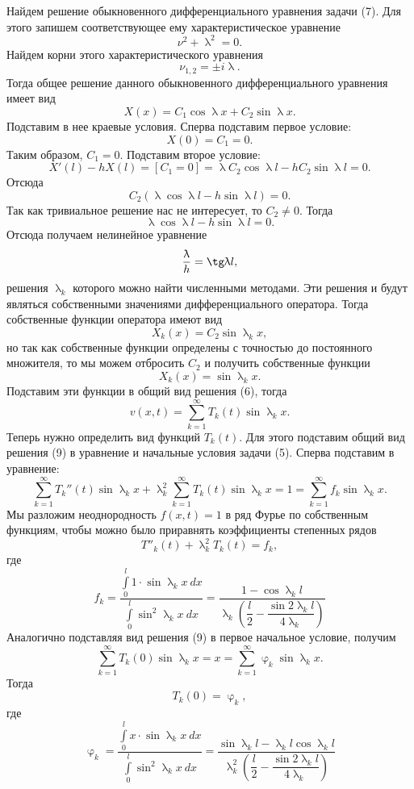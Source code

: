 \documentclass[a4paper, 12pt]{report}
\numberwithin{equation}{section}
\renewcommand{\varphi}{\upvarphi}
\renewcommand{\lambda}{\uplambda}
\newcommand{\intl}{\int\limits_{0}^l}
\newcommand{\sumk}{\sum\limits_{k=1}^\infty}
\begin{document}
	Найдем решение обыкновенного дифференциального уравнения задачи (7). Для этого запишем соответствующее ему характеристическое уравнение
	$$\nu^2 + \lambda ^2 = 0.$$
	Найдем корни этого характеристического уравнения
	$$\nu_{1,2} = \pm i \lambda.$$ Тогда общее решение данного обыкновенного дифференциального уравнения имеет вид
	$$X(x) = C_1\cos \lambda x + C_2 \sin \lambda x.$$
	Подставим в нее краевые условия. Сперва подставим первое условие:
	$$X(0) = C_1 = 0.$$
	Таким образом, $C_1 = 0$. Подставим второе условие:
	$$X'(l) - hX(l) = [C_1 = 0] = \lambda C_2 \cos \lambda l - h C_2\sin \lambda l = 0.$$
	Отсюда
	$$C_2 ( \lambda \cos \lambda l  - h \sin \lambda l) = 0.$$
	Так как тривиальное решение нас не интересует, то $C_2 \ne 0$. Тогда
	$$\lambda \cos \lambda l  - h \sin \lambda l = 0.$$
	Отсюда получаем нелинейное уравнение
	\begin{equation}
		\dfrac{\lambda}{h} = \tg \lambda l,
	\end{equation}
	решения $\lambda_k$ которого можно найти численными методами. Эти решения и будут являться собственными значениями дифференциального оператора. Тогда собственные функции оператора имеют вид
	$$X_k(x) = C_2\sin \lambda_k x,$$
	но так как собственные функции определены с точностью до постоянного множителя, то мы можем отбросить $C_2$ и получить собственные функции
	$$X_k(x) = \sin \lambda_k x.$$
	Подставим эти функции в общий вид решения (6), тогда
	\begin{equation}
		v(x,t) = \sumk T_k(t) \sin \lambda_k x.
	\end{equation}
	Теперь нужно определить вид функций $T_k(t)$. Для этого подставим общий вид решения (9) в уравнение и начальные условия задачи (5). Сперва подставим в уравнение:
	$$\sumk T_k''(t) \sin \lambda_k x + \lambda_k^2\sumk T_k(t) \sin \lambda_k x = 1 = \sumk f_k \sin \lambda_k x.$$
	Мы разложим неоднородность $f(x,t) = 1$ в ряд Фурье по собственным функциям, чтобы можно было приравнять коэффициенты степенных рядов
	$$T''_k(t) + \lambda_k^2 T_k(t) = f_k,$$
	где
	\begin{equation}
		f_k = \dfrac{\intl1\cdot \sin \lambda_k x\ dx}{\intl \sin^2 \lambda_k x\ dx} = \dfrac{1 - \cos \lambda_k l}{\lambda_k \left(\dfrac l 2 - \dfrac{\sin 2 \lambda_k l}{4\lambda _k}\right)}
	\end{equation}
	 Аналогично подставляя вид решения (9) в первое начальное условие, получим
	 $$\sumk T_k(0) \sin \lambda_k x = x = \sumk \varphi_k\sin \lambda_k x .$$
	 Тогда $$T_k (0) = \varphi_k,$$
	 где
	 \begin{equation}
	 	\varphi_k = \dfrac{\intl x\cdot \sin \lambda_k x\ dx}{\intl \sin^2 \lambda_k x\ dx} = \dfrac{\sin \lambda_k l - \lambda_k l\cos \lambda_k l}{\lambda_k^2 \left(\dfrac l 2 - \dfrac{\sin 2 \lambda_k l}{4\lambda _k}\right)}
	 \end{equation}
\end{document}
